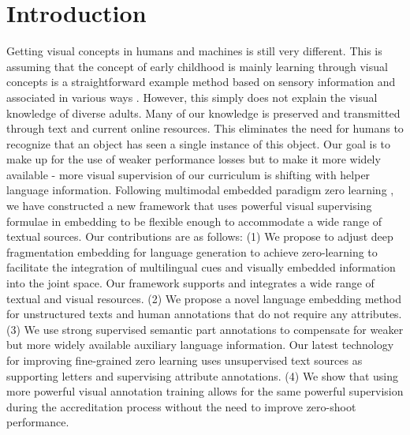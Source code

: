 \documentclass[10pt,twocolumn,letterpaper]{article}
\begin{document}
\section{Introduction}
Getting visual concepts in humans and machines is still very different. This is assuming that the concept of early childhood is mainly learning through visual concepts is a straightforward example method based on sensory information and associated in various ways \cite{Roy_2002_Learning}. However, this simply does not explain the visual knowledge of diverse adults. Many of our knowledge is preserved and transmitted through text and current online resources. This eliminates the need for humans to recognize that an object has seen a single instance of this object. Our goal is to make up for the use of weaker performance losses but to make it more widely available - more visual supervision of our curriculum is shifting with helper language information. Following multimodal embedded paradigm zero learning \cite{Akata_2015_Evaluation}, we have constructed a new framework that uses powerful visual supervising formulae in embedding to be flexible enough to accommodate a wide range of textual sources. Our contributions are as follows: (1) We propose to adjust deep fragmentation embedding\cite{Karpathy_2015_Deep} for language generation to achieve zero-learning to facilitate the integration of multilingual cues and visually embedded information into the joint space. Our framework supports and integrates a wide range of textual and visual resources. (2) We propose a novel language embedding method for unstructured texts and human annotations that do not require any attributes. (3) We use strong supervised semantic part annotations to compensate for weaker but more widely available auxiliary language information. Our latest technology for improving fine-grained zero learning uses unsupervised text sources as supporting letters and supervising attribute annotations. (4) We show that using more powerful visual annotation training allows for the same powerful supervision during the accreditation process without the need to improve zero-shoot performance.
\end{document}
